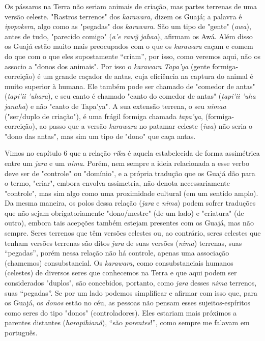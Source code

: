 Os pássaros na Terra não seriam animais de criação, mas partes terrenas
de uma versão celeste. "Rastros terrenos" dos \emph{karawara,} dizem os
Guajá; a palavra é \emph{ipopokera}, algo como as "pegadas" dos
\emph{karawara}. São um tipo de "gente" (\emph{awa}), antes de tudo,
"parecido comigo" (\emph{a'e rawỹ jahaa}), afirmam os Awá. Além disso os
Guajá estão muito mais preocupados com o que os \emph{karawara} caçam e
comem do que com o que eles supostamente ``criam'', por isso, como
veremos aqui, não os associo a "donos dos animais". Por isso o
\emph{karawara} \emph{Tapa'ya} (gente formiga-correição) é um grande
caçador de antas, cuja eficiência na captura do animal é muito superior
à humana. Ele também pode ser chamado de "comedor de antas"
(\emph{tapi'ii 'uhara}), e seu canto é chamado "canto do comedor de
antas" (\emph{tapi'ii 'uha janaha}) e não "canto de Tapa'ya". A sua
extensão terrena, o seu \emph{nimaa} ("ser/duplo de criação"), é uma
frágil formiga chamada \emph{tapa'ya}, (formiga-correição), ao passo que
a versão \emph{karawara} no patamar celeste (\emph{iwa}) não seria o
"dono das antas", mas sim um tipo de "dono" que caça antas.

Vimos no capítulo 6 que a relação \emph{riku} é aquela estabelecida de
forma assimétrica entre um \emph{jara} e um \emph{nima}. Porém, nem
sempre a ideia relacionada a esse verbo deve ser de "controle" ou
"domínio", e a própria tradução que os Guajá dão para o termo, "criar",
embora envolva assimetria, não denota necessariamente "controle", mas
sim algo como uma proximidade cultural (em um sentido amplo). Da mesma
maneira, os polos dessa relação (\emph{jara} e \emph{nima}) podem sofrer
traduções que não sejam obrigatoriamente "dono/mestre" (de um lado) e
"criatura" (de outro), embora tais acepções também estejam presentes com
os Guajá, mas não sempre. Seres terrenos que têm versões celestes ou, ao
contrário, seres celestes que tenham versões terrenas são ditos
\emph{jara} de suas versões (\emph{nima}) terrenas, suas ``pegadas'',
porém nessa relação não há controle, apenas uma associação (chamemos)
consubstancial. Os \emph{karawara}, como consubstanciais humanos
(celestes) de diversos seres que conhecemos na Terra e que aqui podem
ser considerados "duplos", são concebidos, portanto, como \emph{jara}
desses \emph{nima} terrenos, suas ``pegadas''. Se por um lado podemos
simplificar e afirmar com isso que, para os Guajá, os \emph{donos} estão
no céu, as pessoas não pensam esses sujeitos-espíritos como seres do
tipo "donos" (controladores). Eles estariam mais próximos a parentes
distantes (\emph{harapihianã}), ``são \emph{parentes}!'', como sempre me
falavam em português.

